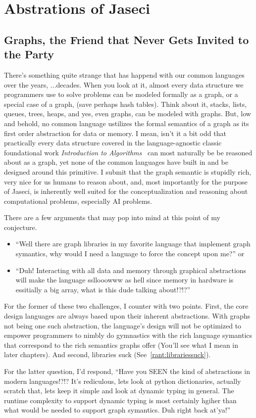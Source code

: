 \chapter{Abstrations of Jaseci}
\section{Graphs, the Friend that Never Gets Invited to the Party}
There's something quite strange that has happend with our \gls{common languages} over the years, ...decades. When you look at it, almost every data structure we programmers use to solve problems can be modeled formally as a graph, or a special case of a graph, (save perhaps hash tables). Think about it, stacks, lists, queues, trees, heaps, and yes, even graphs, can be modeled with graphs. But, low and behold, no common language ustilizes the formal semantics of a graph as its first order abstraction for data or memory. I mean, isn't it a bit odd that practically every data structure covered in the language-agnostic classic foundational work \textit{Introduction to Algorithms}~\cite{intro_to_algo} can most naturally be be reasoned about as a graph, yet none of the common languages have built in and be designed around this primitive. I submit that the graph semantic is stupidly rich, very nice for us humans to reason about, and, most importantly for the purpose of Jaseci, is inherently well suited for the conceptualization and reasoning about computational problems, especially AI problems.
\par
There are a few arguments that may pop into mind at this point of my conjecture.
\begin{itemize}
    \item ``Well there are graph libraries in my favorite language that implement graph symantics, why would I need a language to force the concept upon me?''
          or
    \item ``Duh! Interacting with all data and memory through graphical abstractions will make the language ssllooowww as hell since memory in hardware is essitially a big array, what is this dude talking about!?!?''
\end{itemize}
\par
For the former of these two challenges, I counter with two points. First, the core design languages are always based upon their inherent abstractions. With graphs not being one such abstraction, the language's design will not be optimized to empower programmers to nimbly do gymnastics with the rich language symantics that correspond to the rich semantics graphs offer (You'll see what I mean in later chapters). And second, libraries suck (See~\ref{rant:librariessuck}).
\par
For the latter question, I'd respond, ``Have you SEEN the kind of abstractions in modern languages!?!? It's rediculous, lets look at python dictionaries, actually scratch that, lets keep it simple and look at dynamic typing in general. The runtime complexity to support dynamic typing is most certainly hgiher than what would be needed to support graph symantics. Duh right back at'ya!''
